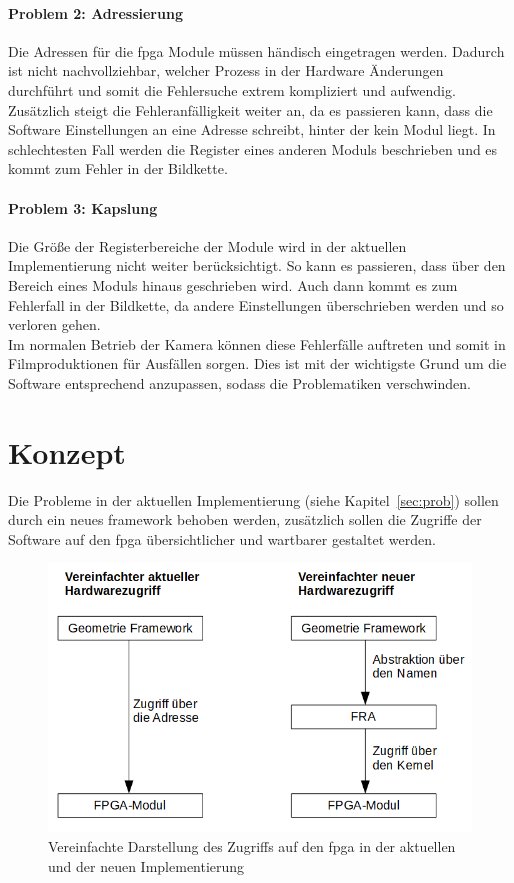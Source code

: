 \paragraph*{Problem 2: Adressierung} Die Adressen für die \ac{fpga} Module müssen händisch eingetragen werden. Dadurch ist nicht nachvollziehbar, welcher Prozess in der Hardware Änderungen durchführt und somit die Fehlersuche extrem kompliziert und aufwendig. Zusätzlich steigt die Fehleranfälligkeit weiter an, da es passieren kann, dass die Software Einstellungen an eine Adresse schreibt, hinter der kein Modul liegt. In schlechtesten Fall werden die Register eines anderen Moduls beschrieben und es kommt zum Fehler in der Bildkette. 

\paragraph*{Problem 3: Kapslung} Die Größe der Registerbereiche der Module wird in der aktuellen Implementierung nicht weiter berücksichtigt. So kann es passieren, dass über den Bereich eines Moduls hinaus geschrieben wird. Auch dann kommt es zum Fehlerfall in der Bildkette, da andere Einstellungen überschrieben werden und so verloren gehen. \\



Im normalen Betrieb der Kamera können diese Fehlerfälle auftreten und somit in Filmproduktionen für Ausfällen sorgen. Dies ist mit der wichtigste Grund um die Software entsprechend anzupassen, sodass die Problematiken verschwinden.


\section{Konzept}\label{sec:konzept}
Die Probleme in der aktuellen Implementierung (siehe Kapitel~\ref{sec:prob}) sollen durch ein neues \gls{framework} behoben werden, zusätzlich sollen die Zugriffe der Software auf den \ac{fpga} übersichtlicher und wartbarer gestaltet werden. 

\begin{figure}[!hbtp]
	\centering
	\includegraphics[width = 0.9\linewidth]{pictures/2019-11-17_ImplementierungNewvsOld.png}
	\smallskip
	\caption{Vereinfachte Darstellung des Zugriffs auf den \ac{fpga} in der aktuellen und der neuen Implementierung}
	\label{fig:newvsold}
\end{figure} 



